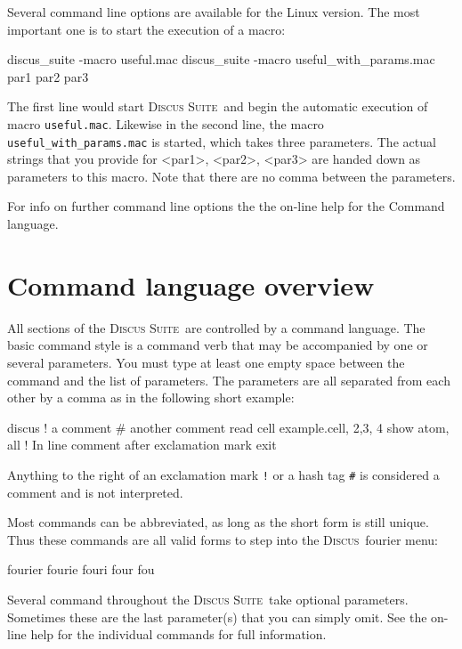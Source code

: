 \documentclass[11pt]{report}
\newcommand{\Discus}{\textsc{Discus\ }}
\newcommand{\Suite}{\textsc{Discus Suite\ }}
\begin{document}
Several command line options are available for the Linux version.
The most important one is to start the execution of a macro:

\begin{MacVerbatim}
discus_suite -macro useful.mac  
discus_suite -macro useful_with_params.mac  par1 par2 par3
\end{MacVerbatim}

The first line would start \Suite and begin the automatic execution
of macro {\tt useful.mac}. Likewise in the second line, the macro
{\tt useful\_with\_params.mac} is started, which takes three parameters.
The actual strings that
you provide for <par1>, <par2>, <par3> are handed down as parameters to 
this macro. Note that there are no comma between the parameters.

For info on further command line options the the on-line help for
the Command language.

\section{Command language overview} \label{over}

All sections of the \Suite are controlled by a command language. The
basic command style is a command verb that may be accompanied by one 
or several parameters. You must type at least one empty space between
the command and the list of parameters. The parameters are all 
separated from each other by a comma as in the following short example: 

\begin{MacVerbatim}
  discus
  ! a comment
  # another comment
  read
  cell example.cell, 2,3, 4
  show atom, all   ! In line comment after exclamation mark
  exit
\end{MacVerbatim}

Anything to the right of an exclamation mark {\tt !} or a hash tag
{\tt \#} is considered a comment and is not interpreted. 

Most commands can be abbreviated, as long as the short form is
still unique. Thus these commands are all valid forms to 
step into the \Discus fourier menu:

\begin{MacVerbatim}
  fourier
  fourie
  fouri
  four
  fou
\end{MacVerbatim}


Several command throughout the \Suite take optional parameters.
Sometimes these are the last parameter(s) that you can simply
omit. See the on-line help for the individual commands for
full information.
\end{document}
